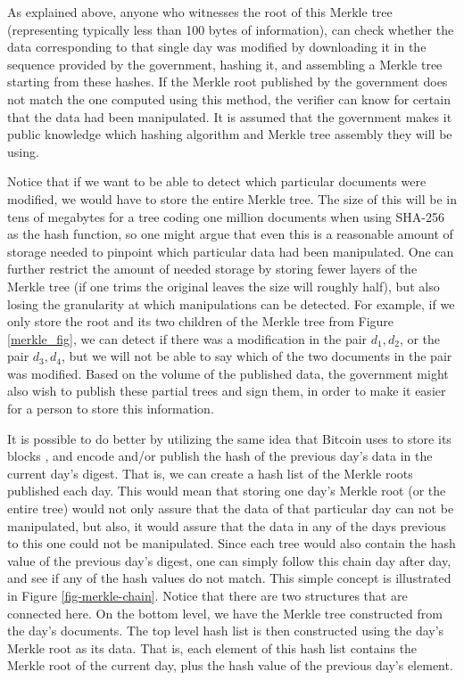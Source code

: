 As explained above, anyone who witnesses the root of this Merkle tree (representing typically less than 100 bytes of information), can check whether the data corresponding to that single day was modified by downloading it in the sequence provided by the government, hashing it, and assembling a Merkle tree starting from these hashes. If the Merkle root published by the government does not match the one computed using this method, the verifier can know for certain that the data had been manipulated. It is assumed that the government makes it public knowledge which hashing algorithm and Merkle tree assembly they will be using.

Notice that if we want to be able to detect which particular documents were modified, we would have to store the entire Merkle tree. The size of this will be in tens of megabytes for a tree coding one million documents when using SHA-256 as the hash function, so one might argue that even this is a reasonable amount of storage needed to pinpoint which particular data had been manipulated. One can further restrict the amount of needed storage by storing fewer layers of the Merkle tree (\ie if one trims the original leaves the size will roughly half), but also losing the granularity at which manipulations can be detected. 
For example, if we only store the root and its two children of the Merkle tree from Figure \ref{merkle_fig}, we can detect if there was a modification in the pair $d_1,d_2$, or the pair $d_3,d_4$, but we will not be able to say which of the two documents in the pair was modified.
Based on the volume of the published data, the government might also wish to publish these partial trees and sign them, in order to make it easier for a person to store this information.

It is possible to do better by utilizing the same idea that Bitcoin uses to store its blocks \cite{whitepaper}, and encode and/or publish the hash of the previous day's data in the current day's digest. That is, we can create a hash list of the Merkle roots published each day. This would mean that storing one day's Merkle root (or the entire tree) would not only assure that the data of that particular day can not be manipulated, but also, it would assure that the data in any of the days previous to this one could not be manipulated. Since each tree would also contain the hash value of the previous day's digest, one can simply follow this chain day after day, and see if any of the hash values do not match. 
This simple concept is illustrated in Figure \ref{fig-merkle-chain}. Notice that there are two structures that are connected here. On the bottom level, we have the Merkle tree constructed from the day's documents. The top level hash list is then constructed using the day's Merkle root as its data. That is, each element of this hash list contains the Merkle root of the current day, plus the hash value of the previous day's element. 

